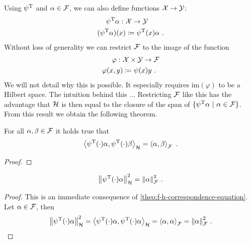 Using $\psi^{\mathrm{T}}$ and $\alpha \in \mathcal{F}$, we can also define functions $\mathcal{X} \rightarrow \mathcal{Y}$:
\begin{align}
		\psi^{\mathrm{T}}\alpha: ~&\mathcal{X} \rightarrow \mathcal{Y} \\
		(\psi^{\mathrm{T}}\alpha)(x) &\coloneqq \psi^{\mathrm{T}}(x)\alpha \ .
\end{align}
Without loss of generality we can restrict $\mathcal{F}$ to the image of the function
\begin{align}
	\varphi: ~&\mathcal{X} \times \mathcal{Y} \rightarrow \mathcal{F}\\
	\varphi(x, y) &\coloneqq \psi(x)y\ .
\end{align}
We will not detail why this is possible.
It especially requires $\mathrm{im}(\varphi)$ to be a Hilbert space.
The intuition behind this ...
Restricting $\mathcal{F}$ like this has the advantage that $\mathcal{H}$ is then equal to the closure of the span of $\{\psi^{\mathrm{T}}\alpha\ |\ \alpha \in \mathcal{F}\}$.
From this result we obtain the following theorem.
\begin{theorem}
	\label{theo:f-h-correspondence-equation}
	For all $\alpha, \beta \in \mathcal{F}$ it holds true that
	\begin{equation}
		\left< \psi^{\mathrm{T}}(\cdot) \alpha, \psi^{\mathrm{T}}(\cdot) \beta\right>_{\mathcal{H}} = \left< \alpha, \beta\right>_{\mathcal{F}} \ .
	\end{equation}
\end{theorem}
\begin{proof}
	
\end{proof}
\begin{corollary}
	\label{cor:feature-space-norm}
	\begin{equation}
		\norm{\psi^{\mathrm{T}}(\cdot)\alpha}_{\mathcal{H}}^2 = \norm{\alpha}_{\mathcal{F}}^2 \ .
	\end{equation}
\end{corollary}
\begin{proof}
	This is an immediate consequence of \cref{theo:f-h-correspondence-equation}.
	Let $\alpha \in \mathcal{F}$, then
	\begin{equation}
		\norm{\psi^{\mathrm{T}}(\cdot)\alpha}_{\mathcal{H}}^2 = \left< \psi^{\mathrm{T}}(\cdot)\alpha, \psi^{\mathrm{T}}(\cdot)\alpha \right>_{\mathcal{H}}
		= \left< \alpha, \alpha \right>_{\mathcal{F}} = \norm{\alpha}_{\mathcal{F}}^2 \ .
	\end{equation}
\end{proof}

